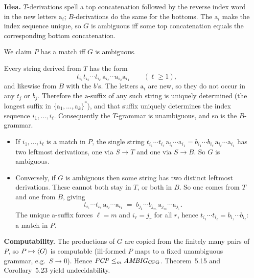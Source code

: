 \begin{soln}
\textbf{Idea.} $T$-derivations spell a top concatenation followed by the reverse index word in the new letters $\mathrm{a}_i$; $B$-derivations do the same for the bottoms. The $\mathrm{a}_i$ make the index sequence unique, so $G$ is ambiguous iff some top concatenation equals the corresponding bottom concatenation.

We claim $P$ has a match iff $G$ is ambiguous.

Every string derived from $T$ has the form
\[
t_{i_1}t_{i_2}\cdots t_{i_\ell}\,\mathrm{a}_{i_\ell}\cdots\mathrm{a}_{i_2}\mathrm{a}_{i_1}
\qquad(\ell\ge 1),
\]
and likewise from $B$ with the $b$'s. The letters $\mathrm{a}_i$ are new, so they do not occur in any $t_j$ or $b_j$. Therefore the $\mathrm{a}$-suffix of any such string is uniquely determined (the longest suffix in $\{\mathrm{a}_1,\dots,\mathrm{a}_k\}^*$), and that suffix uniquely determines the index sequence $i_1,\dots,i_\ell$. Consequently the $T$-grammar is unambiguous, and so is the $B$-grammar.

\begin{itemize}
\item If $i_1,\dots,i_\ell$ is a match in $P$, the single string
$t_{i_1}\cdots t_{i_\ell}\,\mathrm{a}_{i_\ell}\cdots\mathrm{a}_{i_1}
=b_{i_1}\cdots b_{i_\ell}\,\mathrm{a}_{i_\ell}\cdots\mathrm{a}_{i_1}$
has two leftmost derivations, one via $S\to T$ and one via $S\to B$. So $G$ is ambiguous.
\item Conversely, if $G$ is ambiguous then some string has two distinct leftmost derivations. These cannot both stay in $T$, or both in $B$. So one comes from $T$ and one from $B$, giving
\[
t_{i_1}\cdots t_{i_\ell}\,\mathrm{a}_{i_\ell}\cdots\mathrm{a}_{i_1}
\;=\;
b_{j_1}\cdots b_{j_m}\,\mathrm{a}_{j_m}\cdots\mathrm{a}_{j_1}.
\]
The unique $\mathrm{a}$-suffix forces $\ell=m$ and $i_r=j_r$ for all $r$, hence $t_{i_1}\cdots t_{i_\ell}=b_{i_1}\cdots b_{i_\ell}$: a match in $P$.
\end{itemize}
\textbf{Computability.} The productions of $G$ are copied from the finitely many pairs of $P$, so $P\mapsto\langle G\rangle$ is computable (ill-formed $P$ maps to a fixed unambiguous grammar, e.g.\ $S\to 0$). Hence $\mathit{PCP}\le_{m}\mathit{AMBIG}_{\mathrm{CFG}}$. Theorem~5.15 and Corollary~5.23 yield undecidability.
\end{soln}

